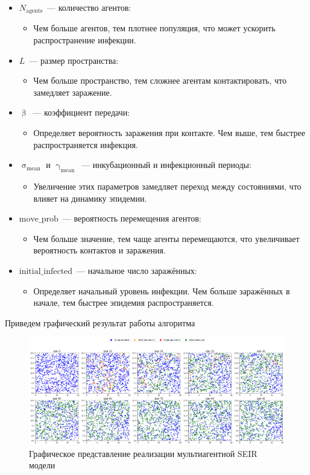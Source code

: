 \documentclass[a4paper, 14pt]{extreport}
\renewcommand{\beta}{\upbeta}
\renewcommand{\gamma}{\upgamma}
\renewcommand{\sigma}{\upsigma}
\begin{document}
	\begin{itemize}
		\item {$N_{\text{agents}}$}~--- количество агентов:
		\begin{itemize}
			\item Чем больше агентов, тем плотнее популяция, что может ускорить распространение инфекции.
		\end{itemize}
		\item \textbf{$L$}~--- размер пространства:
		\begin{itemize}
			\item Чем больше пространство, тем сложнее агентам контактировать, что замедляет заражение.
		\end{itemize}
		\item \textbf{$\beta$}~--- коэффициент передачи:
		\begin{itemize}
			\item Определяет вероятность заражения при контакте. Чем выше, тем быстрее распространяется инфекция.
		\end{itemize}
		\item {$\sigma_{\text{mean}}$ и $\gamma_{\text{mean}}$}~--- инкубационный и инфекционный периоды:
		\begin{itemize}
			\item Увеличение этих параметров замедляет переход между состояниями, что влияет на динамику эпидемии.
		\end{itemize}
		\item {$\text{move\_prob}$}~--- вероятность перемещения агентов:
		\begin{itemize}
			\item Чем больше значение, тем чаще агенты перемещаются, что увеличивает вероятность контактов и заражения.
		\end{itemize}
		\item {$\text{initial\_infected}$}~--- начальное число заражённых:
		\begin{itemize}
			\item Определяет начальный уровень инфекции. Чем больше заражённых в начале, тем быстрее эпидемия распространяется.
		\end{itemize}
	\end{itemize}
	
	Приведем графический результат работы алгоритма
	
	\begin{figure}[h]
		\centering
		\includegraphics[scale=0.3]{images/graph04}
		\caption{Графическое представление реализации мультиагентной SEIR модели}
		\label{fig:graph04}
	\end{figure}
	
\end{document}
